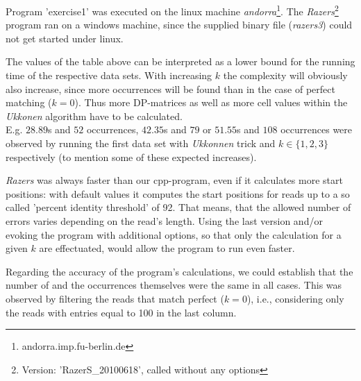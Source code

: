 \documentclass[11pt, notitlepage]{scrartcl}
\begin{document}
Program 'exercise1' was executed on the linux machine \textit{andorra}\footnote{andorra.imp.fu-berlin.de}.  The \textit{Razers}\footnote{Version: 'RazerS\_20100618', called without any options} program ran on a windows machine, since the supplied binary file (\textit{razers3}) could not get started under linux.

The values of the table above can be interpreted as a lower bound for the running time of the respective data sets. With increasing $k$ the complexity will obviously also increase, since more occurrences will be found  than in the case of perfect matching ($k=0$). Thus more DP-matrices as well as more cell values within the \textit{Ukkonen} algorithm have to be calculated. \\
E.g. $28.89$s and $52$ occurrences, $42.35$s and $79$ or $51.55$s and $108$ occurrences were observed by running the first data set with \textit{Ukkonnen} trick and $k \in \{1,2,3\}$ respectively (to mention some of these expected increases).

\textit{Razers} was always faster than our cpp-program, even if it calculates more start positions: with default values it computes the start positions for reads up to a so called 'percent identity threshold' of 92. That means, that the allowed number of errors varies depending on the read's length. Using the last version and/or evoking the program with additional options, so that only the calculation for a given $k$ are effectuated, would allow the program to run even faster.

Regarding the accuracy of the program's calculations, we could establish that the number of and the occurrences themselves were the same in all cases. This was observed by filtering the reads that match perfect ($k=0$), i.e., considering only the reads with entries equal to 100 in the last column.   
\end{document}
